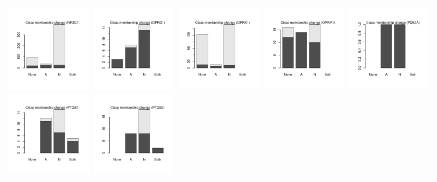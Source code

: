 \documentclass[10pt,article]{memoir}
\begin{document}
\begin{figure}[h!]
\includegraphics[width=0.19\textwidth]{figures/validation_plots/nr3c1_0p8_valplot.pdf}
\includegraphics[width=0.19\textwidth]{figures/validation_plots/oprd1_0p8_valplot.pdf}
\includegraphics[width=0.19\textwidth]{figures/validation_plots/oprk1_0p8_valplot.pdf}
\includegraphics[width=0.19\textwidth]{figures/validation_plots/oprm1_0p8_valplot.pdf}
\includegraphics[width=0.19\textwidth]{figures/validation_plots/pde3a_0p8_valplot.pdf}
\includegraphics[width=0.19\textwidth]{figures/validation_plots/ptgs1_0p8_valplot.pdf}
\includegraphics[width=0.19\textwidth]{figures/validation_plots/ptgs2_0p8_valplot.pdf}

\end{figure}
\end{document}
